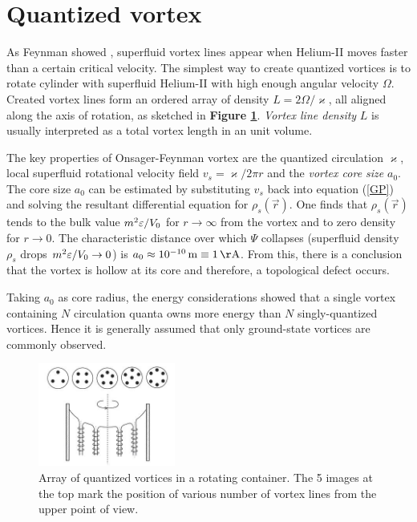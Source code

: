 
\section{Quantized vortex}

As Feynman showed \cite{feynman}, superfluid vortex lines appear when Helium-II moves faster than a certain critical velocity. The simplest way to create quantized vortices is to rotate cylinder with superfluid Helium-II with high enough angular velocity $\Omega$. Created vortex lines form an ordered array of density $L=2\Omega / \varkappa$, all aligned along the axis of rotation, as sketched in \textbf{Figure \ref{rotating-helium}}. \textit{Vortex line density} $L$ is usually interpreted as a total vortex length in an unit volume.

The key properties of Onsager-Feynman vortex \cite{onsager} are the quantized circulation $\varkappa$, local superfluid rotational velocity field $v_s = \varkappa / 2\pi r$ and the \textit{vortex core size} $a_0$. The core size $a_0$ can be estimated by substituting $v_s$ back into equation (\ref{GP}) and solving the resultant differential equation for $\rho_s (\vec{r})$. One finds that $\rho_s (\vec{r})$ tends to the bulk value $m^2 \varepsilon / V_0$ for $r \rightarrow \infty$ from the vortex and to zero density for $r \rightarrow 0$.
The characteristic distance over which $\Psi$ collapses (superfluid density $\rho_s$ drops $m^2 \varepsilon / V_0 \rightarrow 0$) is $a_0 \approx 10^{-10} \unit{m} \equiv 1 \unit{\AA}$. From this, there is a conclusion that the vortex is hollow at its core and therefore, a topological defect occurs.

Taking $a_0$ as core radius, the energy considerations showed that a single vortex containing $N$ circulation quanta owns more energy than $N$ singly-quantized vortices. Hence it is generally assumed that only ground-state vortices are commonly observed.

\begin{figure}[h]
	\centering
	\includegraphics[width=0.4\textwidth]{graphics/theory/rotating-helium}
	\caption{Array of quantized vortices in a rotating container. The 5 images at the top mark the position of various number of vortex lines from the upper point of view.}
	\label{rotating-helium}
\end{figure}

